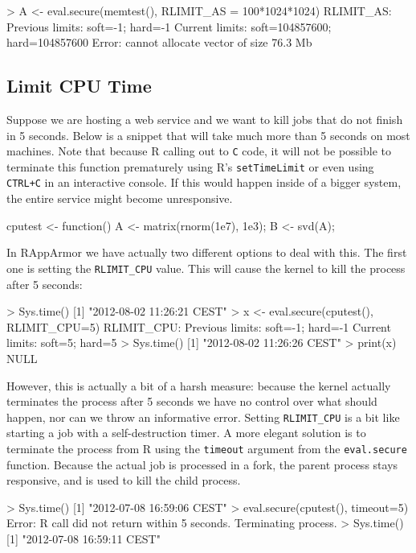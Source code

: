 \documentclass[article]{jss}
\newcommand{\R}{\textsf{R}\xspace}
\begin{document}
\begin{appendices}
\begin{CodeChunk}
\begin{CodeInput}
> A <- eval.secure(memtest(), RLIMIT_AS = 100*1024*1024)
RLIMIT_AS:
Previous limits: soft=-1; hard=-1
Current limits: soft=104857600; hard=104857600
Error: cannot allocate vector of size 76.3 Mb
\end{CodeInput}
\end{CodeChunk}


\subsection{Limit CPU Time}
\label{cputime}

Suppose we are hosting a web service and we want to kill jobs that do not finish
in 5 seconds. Below is a snippet that will take much more than 5 seconds on most
machines. Note that because \R calling out to \texttt{C} code, it will not be
possible to terminate this function prematurely using R's \texttt{setTimeLimit}
or even using \texttt{CTRL+C} in an interactive console. If this would happen
inside of a bigger system, the entire service might become unresponsive.

\begin{CodeChunk}
\begin{CodeInput}
cputest <- function(){
  A <- matrix(rnorm(1e7), 1e3);
  B <- svd(A);
}
\end{CodeInput}
\end{CodeChunk}
In RAppArmor we have actually two different options to deal with this. The first
one is setting the \texttt{RLIMIT\_CPU} value. This will cause the kernel to
kill the process after 5 seconds:
\begin{CodeChunk}
\begin{CodeInput}
> Sys.time()
[1] "2012-08-02 11:26:21 CEST"
> x <- eval.secure(cputest(), RLIMIT_CPU=5)
RLIMIT_CPU:
Previous limits: soft=-1; hard=-1
Current limits: soft=5; hard=5
> Sys.time()
[1] "2012-08-02 11:26:26 CEST"
> print(x)
NULL
\end{CodeInput}
\end{CodeChunk}
However, this is actually a bit of a harsh measure: because the kernel actually
terminates the process after 5 seconds we have no control over what should
happen, nor can we throw an informative error. Setting \texttt{RLIMIT\_CPU} is
a bit like starting a job with a self-destruction timer. A more elegant
solution is to terminate the process from \R using the \texttt{timeout}
argument from the \texttt{eval.secure} function. Because the actual job is processed in a fork, the parent process stays responsive, and is used to kill the child process.
\begin{CodeChunk}
\begin{CodeInput}
> Sys.time()
[1] "2012-07-08 16:59:06 CEST"
> eval.secure(cputest(), timeout=5)
Error: R call did not return within 5 seconds. Terminating process.
> Sys.time()
[1] "2012-07-08 16:59:11 CEST"
\end{CodeInput}
\end{CodeChunk}


\end{appendices}
\end{document}
